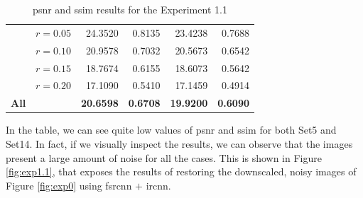 \begin{table}[h]
\begin{tabular}{|l|l|r|r|r|r|}
		\rowcolor[HTML]{FFFFFF} 
		\cellcolor[HTML]{EFEFEF} & $r=0.05$ & 24.3520 & 0.8135 & 23.4238 & 0.7688 \\
		\rowcolor[HTML]{EFEFEF} 
		\cellcolor[HTML]{EFEFEF} & $r=0.10$ & 20.9578 & 0.7032 & 20.5673 & 0.6542 \\
		\rowcolor[HTML]{FFFFFF} 
		\cellcolor[HTML]{EFEFEF} & $r=0.15$ & 18.7674 & 0.6155 & 18.6073 & 0.5642 \\
		\rowcolor[HTML]{EFEFEF} 
		\multirow{-4}{*}{\cellcolor[HTML]{EFEFEF}Uniform} & $r=0.20$ & 17.1090 & 0.5410 & 17.1459 & 0.4914 \\
		\rowcolor[HTML]{FFFFFF} 
		\textbf{All} &  & \textbf{20.6598} & \textbf{0.6708} & \textbf{19.9200} & \textbf{0.6090}\\\hline
	\end{tabular}
	\caption{\gls{psnr} and \gls{ssim} results for the Experiment 1.1}
	\label{tab:experiment11}
\end{table}

In the table, we can see quite low values of \gls{psnr} and \gls{ssim} for both Set5 and Set14. In fact, if we visually inspect the results, we can observe that the images present a large amount of noise for all the cases. This is shown in Figure \ref{fig:exp1.1}, that exposes the results of restoring the downscaled, noisy images of Figure \ref{fig:exp0} using \gls{fsrcnn} $+$ \gls{ircnn}.

